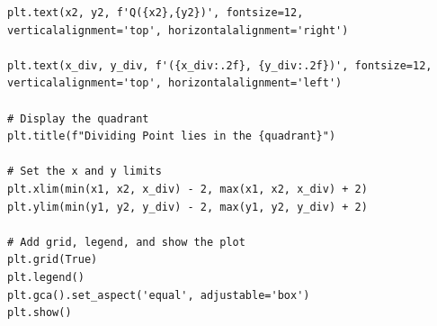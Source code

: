\documentclass{beamer}
\theoremstyle{remark}
\numberwithin{equation}{section}
\begin{document}
\begin{frame}[fragile]
\lstset{style=Pythonstyle}
\begin{lstlisting}
plt.text(x2, y2, f'Q({x2},{y2})', fontsize=12, verticalalignment='top', horizontalalignment='right')

plt.text(x_div, y_div, f'({x_div:.2f}, {y_div:.2f})', fontsize=12, verticalalignment='top', horizontalalignment='left')

# Display the quadrant
plt.title(f"Dividing Point lies in the {quadrant}")

# Set the x and y limits
plt.xlim(min(x1, x2, x_div) - 2, max(x1, x2, x_div) + 2)
plt.ylim(min(y1, y2, y_div) - 2, max(y1, y2, y_div) + 2)

# Add grid, legend, and show the plot
plt.grid(True)
plt.legend()
plt.gca().set_aspect('equal', adjustable='box')
plt.show()


            \end{lstlisting}


\end{frame}
\end{document}
